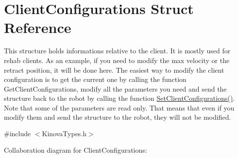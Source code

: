 \hypertarget{struct_client_configurations}{}\section{Client\+Configurations Struct Reference}
\label{struct_client_configurations}


This structure holds informations relative to the client. It is mostly used for rehab clients. As an example, if you need to modify the max velocity or the retract position, it will be done here. The easiest way to modify the client configuration is to get the current one by calling the function Get\+Client\+Configurations, modify all the parameters you need and send the structure back to the robot by calling the function \hyperlink{_kinova_8_a_p_i_8_usb_command_layer_ubuntu_8h_aaaf906c81f0dbdc53101d61c7838eae8}{Set\+Client\+Configurations()}. Note that some of the parameters are read only. That means that even if you modify them and send the structure to the robot, they will not be modified.  




{\ttfamily \#include $<$Kinova\+Types.\+h$>$}



Collaboration diagram for Client\+Configurations\+:
